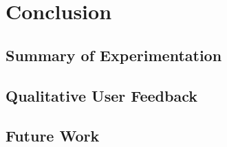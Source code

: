 \chapter{Conclusion} \label{chap:concl}


\section{Summary of Experimentation} \label{sec:summexper}



\section{Qualitative User Feedback} \label{sec:qual}


\section{Future Work} \label{sec:future}
